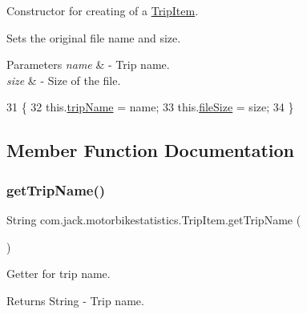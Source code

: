 Constructor for creating of a \hyperlink{classcom_1_1jack_1_1motorbikestatistics_1_1_trip_item}{Trip\+Item}. 

Sets the original file name and size.


\begin{DoxyParams}{Parameters}
{\em name} & -\/ Trip name. \\
\hline
{\em size} & -\/ Size of the file. \\
\hline
\end{DoxyParams}

\begin{DoxyCode}
31                                            \{
32         this.\hyperlink{classcom_1_1jack_1_1motorbikestatistics_1_1_trip_item_a2e678c328ae2972516c2da9d21826359}{tripName} = name;
33         this.\hyperlink{classcom_1_1jack_1_1motorbikestatistics_1_1_trip_item_ac7b1106a5db61eb17cfd3f314a885a3d}{fileSize} = size;
34     \}
\end{DoxyCode}


\subsection{Member Function Documentation}
\mbox{\label{classcom_1_1jack_1_1motorbikestatistics_1_1_trip_item_a0416f27a3fcd2344fca453f7a2a6b4d0}} 
\subsubsection{\texorpdfstring{get\+Trip\+Name()}{getTripName()}}
{\footnotesize\ttfamily String com.\+jack.\+motorbikestatistics.\+Trip\+Item.\+get\+Trip\+Name (\begin{DoxyParamCaption}{ }\end{DoxyParamCaption})\hspace{0.3cm}{\ttfamily [inline]}}



Getter for trip name. 

\begin{DoxyReturn}{Returns}
String -\/ Trip name. 
\end{DoxyReturn}


